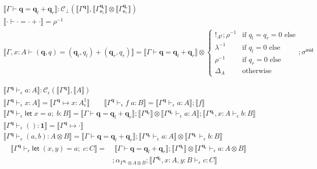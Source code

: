 \documentclass[acmsmall,screen,review]{acmart}
\newcommand{\mc}[1]{\ensuremath{\mathcal{#1}}}
\newcommand{\mb}[1]{\ensuremath{\mathbf{#1}}}
\newcommand{\ms}[1]{\ensuremath{\mathsf{#1}}}
\newcommand{\letexpr}[3]{\ensuremath{\ms{let}\;#1 = #2;\;#3}}
\newcommand{\qsp}[4]{#1 \vdash #2 = #3 + #4}
\newcommand{\cwk}[2]{#1 \mapsto #2}
\newcommand{\hasty}[4]{#1 \vdash_{#2} #3: {#4}}
\newcommand{\dnt}[1]{\llbracket{#1}\rrbracket}
\newcommand{\oneq}{1}
\begin{document}
\begin{gather*}
  \boxed{\dnt{\qsp{\Gamma}{\mb{q}}{\mb{q}_l}{\mb{q}_r}} 
    : \mc{C}_\bot(\dnt{\Gamma^{\mb{q}}}, 
      \dnt{\Gamma^{\mb{q}_l}_{\mb{e}_l}} \otimes \dnt{\Gamma^{\mb{q}_r}_{\mb{e}_r}})} 
  \\
  \dnt{\qsp{\cdot}{\cdot}{\cdot}{\cdot}} = \rho^{-1}
  \\
  \dnt{\qsp{\Gamma, x : A}{(\mb{q}, q)}{(\mb{q}_l, q_l)}{(\mb{q}_r, q_r)}}
  = \dnt{\qsp{\Gamma}{\mb{q}}{\mb{q}_l}{\mb{q}_r}} \otimes
  \begin{cases}
    !_{A^q} ; \rho^{-1} & \text{if } q_l = q_r = 0 \text{ else} \\
    \lambda^{-1} & \text{if } q_l = 0 \text{ else} \\
    \rho^{-1} & \text{if } q_r = 0 \text{ else} \\
    \Delta_A & \text{otherwise}
  \end{cases} ; \sigma^{\ms{mid}}
\end{gather*}

\begin{gather*}
  \boxed{\dnt{\hasty{\Gamma^{\mb{q}}}{\epsilon}{a}{A}} 
    : \mc{C}_\epsilon(\dnt{\Gamma^{\mb{q}}}, \dnt{A})} \\
  \dnt{\hasty{\Gamma^{\mb{q}}}{\epsilon}{x}{A}} 
    = \dnt{\cwk{\Gamma^{\mb{q}}}{x : A^\oneq_\epsilon}}
  \qquad
  \dnt{\hasty{\Gamma^{\mb{q}}}{\epsilon}{f\;a}{B}} 
    = \dnt{\hasty{\Gamma^{\mb{q}}}{\epsilon}{a}{A}} ; \dnt{f} \\
  \dnt{\hasty{\Gamma^{\mb{q}}}{\epsilon}{\letexpr{x}{a}{b}}{B}} 
    = \dnt{\qsp{\Gamma}{\mb{q}}{\mb{q}_l}{\mb{q}_r}}
    ; \dnt{\Gamma^{\mb{q}_l}} 
      \otimes \dnt{\hasty{\Gamma^{\mb{q}_r}}{\epsilon}{a}{A}}
    ; \dnt{\hasty{\Gamma^{\mb{q}_l}, x : A}{\epsilon}{b}{B}}
  \\
  \dnt{\hasty{\Gamma^{\mb{q}}}{\epsilon}{()}{\mb{1}}}
    = \dnt{\cwk{\Gamma^{\mb{q}}}{\cdot}}
  \\
  \dnt{\hasty{\Gamma^{\mb{q}}}{\epsilon}{(a, b)}{A \otimes B}}
    = \dnt{\qsp{\Gamma}{\mb{q}}{\mb{q}_l}{\mb{q}_r}}
    ; \dnt{\hasty{\Gamma^{\mb{q}_l}}{\epsilon}{a}{A}}
    \otimes \dnt{\hasty{\Gamma^{\mb{q}_r}}{\epsilon}{b}{B}}
\end{gather*}
\begin{align*}
  \dnt{\hasty{\Gamma^{\mb{q}}}{\epsilon}{\letexpr{(x, y)}{a}{c}}{C}}
  = & \; \dnt{\qsp{\Gamma}{\mb{q}}{\mb{q}_l}{\mb{q}_r}}
    ; \dnt{\Gamma^{\mb{q}_l}}
    \otimes \dnt{\hasty{\Gamma^{\mb{q}_r}}{\epsilon}{a}{A \otimes B}}
  \\ & 
  ; \alpha_{\Gamma^{\mb{q}_r} \otimes A \otimes B}
  ; \dnt{\hasty{\Gamma^{\mb{q}_l}, x : A, y : B}{\epsilon}{c}{C}} \\
\end{align*}
\end{document}
